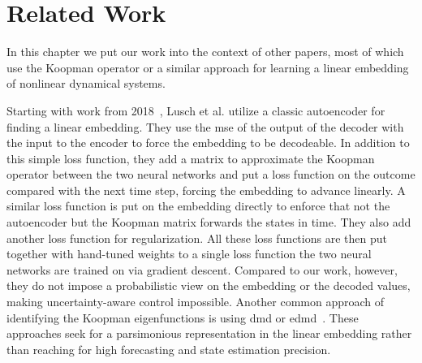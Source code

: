 \chapter{Related Work}
\label{c:relatedWork}



In this chapter we put our work into the context of other papers, most of which use the Koopman operator or a similar approach for learning a linear embedding of nonlinear dynamical systems.

Starting with work from 2018~\cite{luschDeepLearningUniversal2018}, Lusch et al. utilize a classic autoencoder for finding a linear embedding. They use the \ac{mse} of the output of the decoder with the input to the encoder to force the embedding to be decodeable. In addition to this simple loss function, they add a matrix to approximate the Koopman operator between the two neural networks and put a loss function on the outcome compared with the next time step, forcing the embedding to advance linearly. A similar loss function is put on the embedding directly to enforce that not the autoencoder but the Koopman matrix forwards the states in time. They also add another loss function for regularization. All these loss functions are then put together with hand-tuned weights to a single loss function the two neural networks are trained on via gradient descent. Compared to our work, however, they do not impose a probabilistic view on the embedding or the decoded values, making uncertainty-aware control impossible. Another common approach of identifying the Koopman eigenfunctions is using \ac{dmd} or \ac{edmd}~\cite{bruntonKoopmanInvariantSubspaces2016,kaiserDatadrivenDiscoveryKoopman2020,williamsDataDrivenApproximation2015}. These approaches seek for a parsimonious representation in the linear embedding rather than reaching for high forecasting and state estimation precision.

